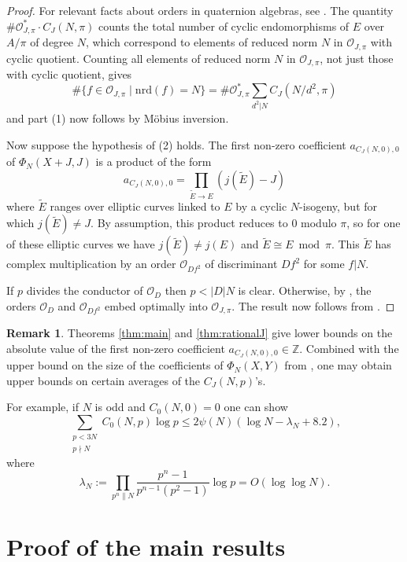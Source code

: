 \documentclass[11pt]{amsart}
\theoremstyle{definition}
\newtheorem{rem}[prop]{Remark}
\def\BZ{\mathbb{Z}}
\def\CO{\mathcal{O}}
\begin{document}
\begin{proof}
    For relevant facts about orders in quaternion algebras, see \cite[\S41-42]{Voight2021}.
    The quantity $\#\CO_{J,\pi}^* \cdot C_J(N,\pi)$ counts the total number of cyclic endomorphisms of $E$ over $A/\pi$ of degree $N$, which correspond to elements of reduced norm $N$ in $\CO_{J,\pi}$ with cyclic quotient.
    Counting all elements of reduced norm $N$ in $\CO_{J,\pi}$, not just those with cyclic quotient, gives
    \[
    \#\{f\in\CO_{J,\pi} \; |\; \mathrm{nrd}(f) = N \} = \#\CO_{J,\pi}^* \sum_{d^2|N} C_J(N/d^2,\pi)
    \]
    and part (1) now follows by M\"obius inversion.

    Now suppose the hypothesis of (2) holds. 
    The first non-zero coefficient $a_{C_J(N,0),0}$ of $\Phi_N(X+J,J)$ is a product of the form
    \[
    a_{C_J(N,0),0} = \prod_{\tilde{E}\to E}(j(\tilde{E})-J)
    \]
    where $\tilde{E}$ ranges over elliptic curves linked to $E$ by a cyclic $N$-isogeny, but for which $j(\tilde{E})\neq J$.    
    By assumption, this product reduces to 0 modulo $\pi$, so for one of these elliptic curves we have $j(\tilde{E})\neq j(E)$ and $\tilde{E}\cong E \bmod \pi$.
    This $\tilde{E}$ has complex multiplication by an order $\CO_{Df^2}$ of discriminant $Df^2$ for some $f|N$. 
    
    If $p$ divides the conductor of $\CO_D$ then $p < |D|N$ is clear. Otherwise, by \cite[Prop 2.2.]{LV2015}, the orders $\CO_D$ and $\CO_{Df^2}$ embed optimally into $\CO_{J,\pi}$. The result now follows from \cite[Thm. 2']{Kaneko1989}.
\end{proof}

\begin{rem}
    Theorems \ref{thm:main} and \ref{thm:rationalJ} give lower bounds on the absolute value of the first non-zero coefficient $a_{C_J(N,0),0}\in\BZ$. Combined with the upper bound on the size of the coefficients of $\Phi_N(X,Y)$ from \cite{BPG2025}, one may obtain upper bounds on certain averages of the $C_J(N,p)$'s. 

    For example, if $N$ is odd and $C_0(N,0)=0$ one can show
    \[
    \sum_{\substack{p < 3N \\ p\nmid N}} C_0(N,p)\log p \leq 2\psi(N)(\log N - \lambda_N + 8.2),
    \]
    where
    \[
    \lambda_N := \prod_{p^n\|N}\frac{p^n-1}{p^{n-1}(p^2-1)}\log p = O(\log\log N).
    \]  
\end{rem}

\section{Proof of the main results}
\end{document}
